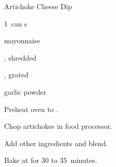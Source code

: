 \begin{recipe}{Artichoke Cheese Dip}{}{}

\begin{ingredients}
\item 1~can s
\item {} mayonnaise
\item \C{1\half} , shredded 
\item {} , grated
\item {} garlic powder
\end{ingredients}

\begin{directions}
\item Preheat oven to .
\item Chop artichokes in food processor.
\item Add other ingredients and blend.
\item Bake at  for 30 to 35~minutes.
\end{directions}

\end{recipe}
